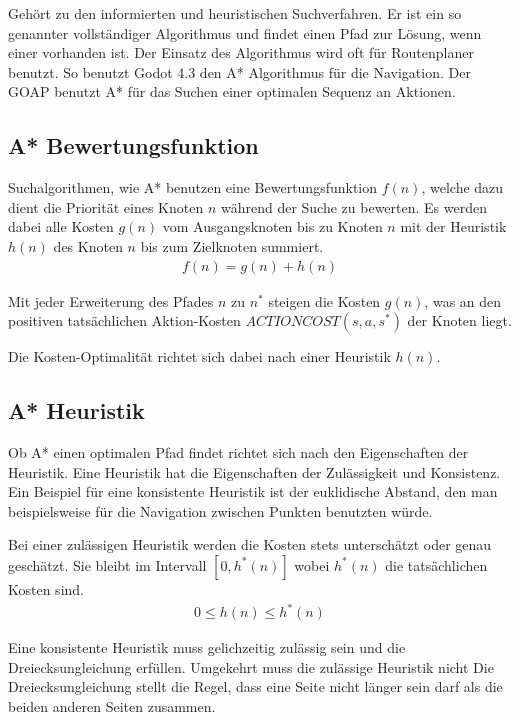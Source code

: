 Gehört zu den informierten und heuristischen Suchverfahren. Er ist ein so genannter vollständiger Algorithmus und findet einen Pfad zur Lösung, wenn einer vorhanden ist. Der Einsatz des Algorithmus wird oft für Routenplaner benutzt. So benutzt Godot 4.3 den A* Algorithmus für die Navigation. Der GOAP benutzt A* für das Suchen einer optimalen Sequenz an Aktionen.

\subsection{A* Bewertungsfunktion}
Suchalgorithmen, wie A* benutzen eine Bewertungsfunktion $f(n)$, welche dazu dient die Priorität eines Knoten $n$ während der Suche zu bewerten. Es werden dabei alle Kosten $g(n)$ vom Ausgangsknoten bis zu Knoten $n$ mit der Heuristik $h(n)$ des Knoten $n$ bis zum Zielknoten summiert.
\begin{align*}
f(n) = g(n) + h(n)
\end{align*}

Mit jeder Erweiterung des Pfades $n$ zu $n^{\ast}$ steigen die Kosten $g(n)$, was an den positiven tatsächlichen Aktion-Kosten $ACTIONCOST(s,a,s^*)$ der Knoten liegt. 


Die Kosten-Optimalität richtet sich dabei nach einer Heuristik $h(n)$.

\subsection{A* Heuristik}
Ob A* einen optimalen Pfad findet richtet sich nach den Eigenschaften der Heuristik. Eine Heuristik hat die Eigenschaften der Zulässigkeit und Konsistenz. Ein Beispiel für eine konsistente Heuristik ist der euklidische Abstand, den man beispielsweise für die Navigation zwischen Punkten benutzten würde.

Bei einer zulässigen Heuristik werden die Kosten stets unterschätzt oder genau geschätzt. Sie bleibt im Intervall $[0, h^{\ast}(n)]$ wobei $h^{\ast}(n)$ die tatsächlichen Kosten sind.
\begin{align*}
0 \leq h(n) \leq h^*(n)
\end{align*}

Eine konsistente Heuristik muss gelichzeitig zulässig sein und die Dreiecksungleichung erfüllen. Umgekehrt muss die zulässige Heuristik nicht  Die Dreiecksungleichung stellt die Regel, dass eine Seite nicht länger sein darf als die beiden anderen Seiten zusammen.

